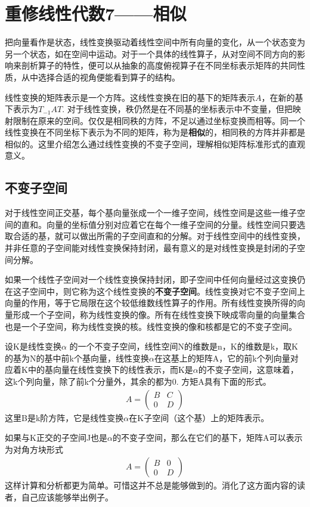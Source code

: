 \chapter{重修线性代数7——相似}
	把向量看作是状态，线性变换驱动着线性空间中所有向量的变化，从一个状态变为另一个状态，如在空间中运动。对于一个具体的线性算子，从对空间不同方向的影响来剖析算子的特性，便可以从抽象的高度俯视算子在不同坐标表示矩阵的共同性质，从中选择合适的视角便能看到算子的结构。
	
	线性变换的矩阵表示是一个方阵。这线性变换在旧的基下的矩阵表示$ A $，在新的基下表示为$ T_{-1}AT $. 对于线性变换，秩仍然是在不同基的坐标表示中不变量，但把映射限制在原来的空间。仅仅是相同秩的方阵，不足以通过坐标变换而相等。同一个线性变换在不同坐标下表示为不同的矩阵，称为是\textbf{相似}的，相同秩的方阵并非都是相似的。这里介绍怎么通过线性变换的不变子空间，理解相似矩阵标准形式的直观意义。
	
	\section{不变子空间}
	
	对于线性空间正交基，每个基向量张成一个一维子空间，线性空间是这些一维子空间的直和。向量的坐标值分别对应着它在每个一维子空间的分量。线性空间只要选取合适的基，就可以做出所需的子空间直和的分解。对于线性空间中的线性变换，并非任意的子空间能对线性变换保持封闭，最有意义的是对线性变换是封闭的子空间分解。
	
	如果一个线性子空间对一个线性变换保持封闭，即子空间中任何向量经过这变换仍在这子空间中，则它称为这个线性变换的\textbf{不变子空间}。线性变换对它不变子空间上向量的作用，等于它局限在这个较低维数线性算子的作用。所有线性变换所得的向量形成一个子空间，称为线性变换的像。所有在线性变换下映成零向量的向量集合也是一个子空间，称为线性变换的核。线性变换的像和核都是它的不变子空间。
	
	设K是线性变换$ \alpha $ 的一个不变子空间，线性空间N的维数是n，K的维数是k，取K的基为N的基中前k个基向量，线性变换$ \alpha $在这基上的矩阵A，它的前k个列向量对应着K中的基向量在线性变换下的线性表示，而K是$ \alpha $的不变子空间，这意味着，这k个列向量，除了前k个分量外，其余的都为0. 方矩A具有下面的形式。
	\begin{gather*}
		A = \begin{pmatrix} B & C\\0 & D\end{pmatrix}
	\end{gather*}
	这里B是k阶方阵，它是线性变换$ \alpha $在K子空间（这个基）上的矩阵表示。
	
	如果与K正交的子空间J也是$ \alpha $的不变子空间，那么在它们的基下，矩阵A可以表示为对角方块形式
	\begin{gather*}
	A = \begin{pmatrix} B & 0\\0 & D\end{pmatrix}
	\end{gather*}
	这样计算和分析都更为简单。可惜这并不总是能够做到的。消化了这方面内容的读者，自己应该能够举出例子。
	
